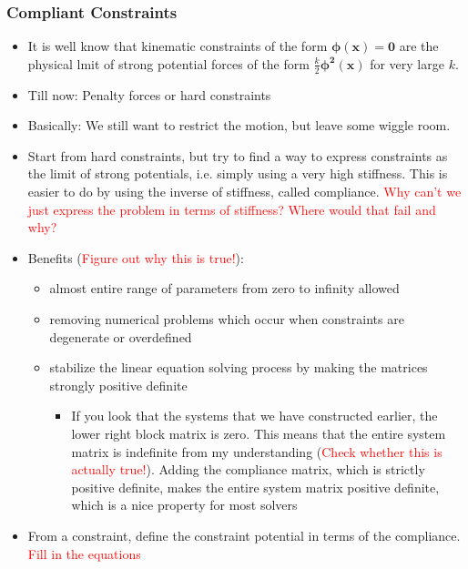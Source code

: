 \documentclass{article}
\begin{document}
\subsubsection*{Compliant Constraints}
\begin{itemize}
    \item It is well know that kinematic constraints of the form $\bm{\phi(x) = 0}$ are the physical lmit of strong potential forces of the form
        $\frac{k}{2} \bm{\phi^2(x)}$ for very large $k$.
    \item Till now: Penalty forces or hard constraints
    \item Basically: We still want to restrict the motion, but leave some wiggle room. 
    \item Start from hard constraints, but try to find a way to express constraints as the limit of strong potentials, i.e. simply using a very high
        stiffness. This is easier to do by using the inverse of stiffness, called compliance. \textcolor{red}{Why can't we just express the problem
        in terms of stiffness? Where would that fail and why?}
    \item Benefits (\textcolor{red}{Figure out why this is true!}):
        \begin{itemize}
            \item almost entire range of parameters from zero to infinity allowed 
            \item removing numerical problems which occur when constraints are degenerate or overdefined
            \item stabilize the linear equation solving process by making the matrices strongly positive definite 
                \begin{itemize}
                    \item If you look that the systems that we have constructed earlier, the lower right block matrix is zero. This means that the entire 
                    system matrix is indefinite from my understanding (\textcolor{red}{Check whether this is actually true!}). Adding the compliance
                    matrix, which is strictly positive definite, makes the entire system matrix positive definite, which is a nice property for most 
                    solvers
                \end{itemize}
        \end{itemize}
    \item From a constraint, define the constraint potential in terms of the compliance. \textcolor{red}{Fill in the equations}

\end{itemize}
\end{document}
